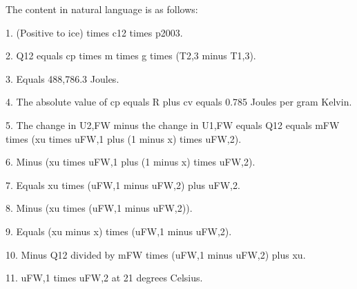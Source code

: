 The content in natural language is as follows:

1. (Positive to ice) times c12 times p2003.

2. Q12 equals cp times m times g times (T2,3 minus T1,3).

3. Equals 488,786.3 Joules.

4. The absolute value of cp equals R plus cv equals 0.785 Joules per gram Kelvin.

5. The change in U2,FW minus the change in U1,FW equals Q12 equals mFW times (xu times uFW,1 plus (1 minus x) times uFW,2).

6. Minus (xu times uFW,1 plus (1 minus x) times uFW,2).

7. Equals xu times (uFW,1 minus uFW,2) plus uFW,2.

8. Minus (xu times (uFW,1 minus uFW,2)).

9. Equals (xu minus x) times (uFW,1 minus uFW,2).

10. Minus Q12 divided by mFW times (uFW,1 minus uFW,2) plus xu.

11. uFW,1 times uFW,2 at 21 degrees Celsius.